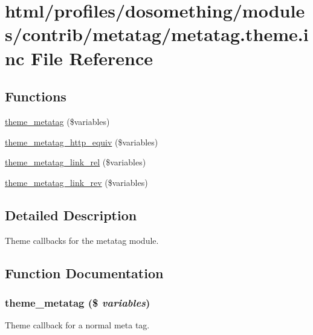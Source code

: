 \hypertarget{metatag_8theme_8inc}{
\section{html/profiles/dosomething/modules/contrib/metatag/metatag.theme.inc File Reference}
\label{metatag_8theme_8inc}
}
\subsection*{Functions}
\begin{DoxyCompactItemize}
\item 
\hyperlink{metatag_8theme_8inc_a579f93ba9c7789cfef0dfe06cb6e8fe1}{theme\_\-metatag} (\$variables)
\item 
\hyperlink{metatag_8theme_8inc_a527af0807d455a67255c1057b2b12ccf}{theme\_\-metatag\_\-http\_\-equiv} (\$variables)
\item 
\hyperlink{metatag_8theme_8inc_a48c5683c8727cf29f68773207111ca71}{theme\_\-metatag\_\-link\_\-rel} (\$variables)
\item 
\hyperlink{metatag_8theme_8inc_adc3d79e746ab41a9b446014a250f388f}{theme\_\-metatag\_\-link\_\-rev} (\$variables)
\end{DoxyCompactItemize}


\subsection{Detailed Description}
Theme callbacks for the metatag module. 

\subsection{Function Documentation}
\hypertarget{metatag_8theme_8inc_a579f93ba9c7789cfef0dfe06cb6e8fe1}{
\subsubsection[{theme\_\-metatag}]{\setlength{\rightskip}{0pt plus 5cm}theme\_\-metatag (\$ {\em variables})}}
\label{metatag_8theme_8inc_a579f93ba9c7789cfef0dfe06cb6e8fe1}
Theme callback for a normal meta tag.

